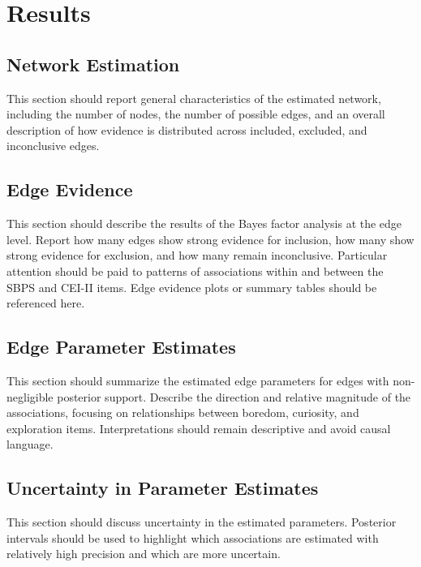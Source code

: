 \documentclass[
  letterpaper,
  DIV=11,
  numbers=noendperiod]{scrartcl}
\begin{document}
\section{Results}\label{results}

\subsection{Network Estimation}\label{network-estimation}

This section should report general characteristics of the estimated
network, including the number of nodes, the number of possible edges,
and an overall description of how evidence is distributed across
included, excluded, and inconclusive edges.

\subsection{Edge Evidence}\label{edge-evidence}

This section should describe the results of the Bayes factor analysis at
the edge level. Report how many edges show strong evidence for
inclusion, how many show strong evidence for exclusion, and how many
remain inconclusive. Particular attention should be paid to patterns of
associations within and between the SBPS and CEI-II items. Edge evidence
plots or summary tables should be referenced here.

\subsection{Edge Parameter Estimates}\label{edge-parameter-estimates}

This section should summarize the estimated edge parameters for edges
with non-negligible posterior support. Describe the direction and
relative magnitude of the associations, focusing on relationships
between boredom, curiosity, and exploration items. Interpretations
should remain descriptive and avoid causal language.

\subsection{Uncertainty in Parameter
Estimates}\label{uncertainty-in-parameter-estimates}

This section should discuss uncertainty in the estimated parameters.
Posterior intervals should be used to highlight which associations are
estimated with relatively high precision and which are more uncertain.
\end{document}
